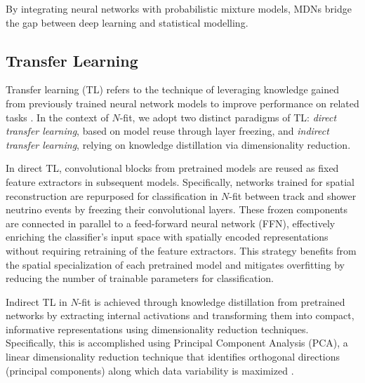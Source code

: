 By integrating neural networks with probabilistic mixture models, MDNs bridge the gap between deep learning and statistical modelling.

\subsection{Transfer Learning}
\label{subsec:TL}

Transfer learning (TL) refers to the technique of leveraging knowledge gained from previously trained neural network models to improve performance on related tasks \cite{Transfer}. In the context of $N$-fit, we adopt two distinct paradigms of TL: \emph{direct transfer learning}, based on model reuse through layer freezing, and \emph{indirect transfer learning}, relying on knowledge distillation via dimensionality reduction.


In direct TL, convolutional blocks from pretrained models are reused as fixed feature extractors in subsequent models. Specifically, networks trained for spatial reconstruction are repurposed for classification in $N$-fit between track and shower neutrino events by freezing their convolutional layers. These frozen components are connected in parallel to a feed-forward neural network (FFN), effectively enriching the classifier's input space with spatially encoded representations without requiring retraining of the feature extractors. This strategy benefits from the spatial specialization of each pretrained model and mitigates overfitting by reducing the number of trainable parameters for classification.


Indirect TL in $N$-fit is achieved through knowledge distillation \cite{moslemi2024} from pretrained networks by extracting internal activations and transforming them into compact, informative representations using dimensionality reduction techniques. Specifically, this is accomplished using Principal Component Analysis (PCA), a linear dimensionality reduction technique that identifies orthogonal directions (principal components) along which data variability is maximized \cite{PCA}.


